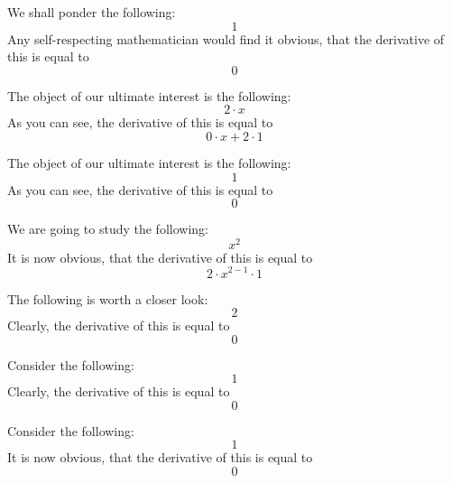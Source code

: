 \documentclass{article}
\begin{document}
We shall ponder the following:
\begin{equation}
1 
\end{equation}
Any self-respecting mathematician would find it obvious, that the derivative of this is equal to
\begin{equation}
0 
\end{equation}

The object of our ultimate interest is the following:
\begin{equation}
2 \cdot x 
\end{equation}
As you can see, the derivative of this is equal to
\begin{equation}
0 \cdot x + 2 \cdot 1 
\end{equation}

The object of our ultimate interest is the following:
\begin{equation}
1 
\end{equation}
As you can see, the derivative of this is equal to
\begin{equation}
0 
\end{equation}

We are going to study the following:
\begin{equation}
x ^{2 } 
\end{equation}
It is now obvious, that the derivative of this is equal to
\begin{equation}
2 \cdot x ^{2 - 1 } \cdot 1 
\end{equation}

The following is worth a closer look:
\begin{equation}
2 
\end{equation}
Clearly, the derivative of this is equal to
\begin{equation}
0 
\end{equation}

Consider the following:
\begin{equation}
1 
\end{equation}
Clearly, the derivative of this is equal to
\begin{equation}
0 
\end{equation}

Consider the following:
\begin{equation}
1 
\end{equation}
It is now obvious, that the derivative of this is equal to
\begin{equation}
0 
\end{equation}
\end{document}
